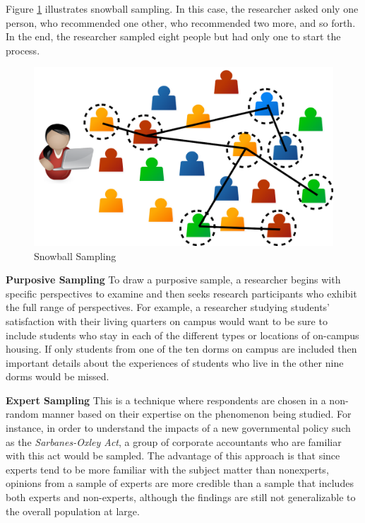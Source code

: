 Figure \ref{07:fig09} illustrates snowball sampling. In this case, the researcher asked only one person, who recommended one other, who recommended two more, and so forth. In the end, the researcher sampled eight people but had only one to start the process.

\begin{figure}[H]
	\centering
	\includegraphics[width=\maxwidth{.35\linewidth}]{gfx/07-09}
	\caption{Snowball Sampling}
	\label{07:fig09}
\end{figure}

\textbf{Purposive Sampling} To draw a purposive sample, a researcher begins with specific perspectives to examine and then seeks research participants who exhibit the full range of perspectives. For example, a researcher studying students' satisfaction with their living quarters on campus would want to be sure to include students who stay in each of the different types or locations of on-campus housing. If only students from one of the ten dorms on campus are included then important details about the experiences of students who live in the other nine dorms would be missed. 

\textbf{Expert Sampling} This is a technique where respondents are chosen in a non-random manner based on their expertise on the phenomenon being studied. For instance, in order to understand the impacts of a new governmental policy such as the \textit{Sarbanes-Oxley Act}, a group of corporate accountants who are familiar with this act would be sampled. The advantage of this approach is that since experts tend to be more familiar with the subject matter than nonexperts, opinions from a sample of experts are more credible than a sample that includes both experts and non-experts, although the findings are still not generalizable to the overall population at large.


